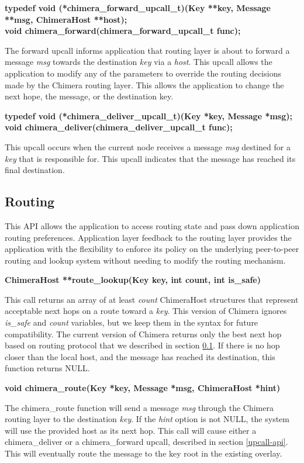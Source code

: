 {\noindent \bf typedef void (*chimera\_forward\_upcall\_t)(Key **key, Message **msg, ChimeraHost **host);}\\
{\noindent \bf void chimera\_forward(chimera\_forward\_upcall\_t func);}

The forward upcall informs application that routing layer is about to forward
a message {\em msg} towards the destination {\em key} via a {\em host}.
This upcall allows the application to
modify any of the parameters to override the routing decisions made by
the Chimera routing layer. This allows the application to change the next
hope, the message, or the destination key.

{\noindent \bf typedef void (*chimera\_deliver\_upcall\_t)(Key *key, Message *msg);}\\
{\noindent \bf void chimera\_deliver(chimera\_deliver\_upcall\_t func);}

This upcall occurs when the current node receives a message {\em msg} destined
for a {\em key} that is responsible for. This upcall indicates that the
message has reached its final destination.

\subsection{Routing}
\label{routing-api}

This API allows the application to access routing state and
pass down application routing preferences. Application layer feedback
to the routing layer provides the application with the flexibility to
enforce its policy on the underlying peer-to-peer routing and lookup
system without needing to modify the routing mechanism.

{\noindent \bf ChimeraHost **route\_lookup(Key key, int count, int is\_safe)}

This call
returns an array of at least {\em count} ChimeraHost structures that
represent acceptable next hops on a route toward a {\em key}. This
version of Chimera ignores {\em is\_safe}
and {\em count} variables, but we keep them in the syntax
for future compatibility. The current version of Chimera returns only the
best next hop based on routing protocol that we described in section
\ref{routing-api}. If there is no hop closer than the local host, and the
message has reached its destination, this function returns NULL.

{\noindent \bf void chimera\_route(Key *key, Message *msg, ChimeraHost *hint)}

The chimera\_route function will send a message {\em msg}
through the Chimera routing layer to the destination {\em key}. If the {\em
hint} option is not NULL, the system will use the provided host as its
next hop. This call will cause either a chimera\_deliver or a 
chimera\_forward upcall, described in section \ref{upcall-api}. This will
eventually route the message to the key root in the existing overlay.

